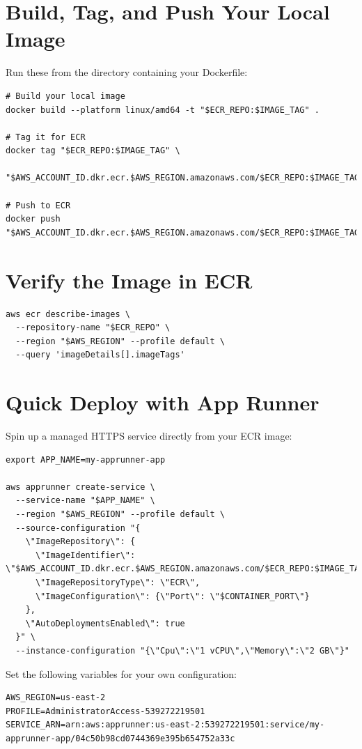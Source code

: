 \section{Build, Tag, and Push Your Local Image}
Run these from the directory containing your Dockerfile:

\begin{verbatim}
# Build your local image
docker build --platform linux/amd64 -t "$ECR_REPO:$IMAGE_TAG" .

# Tag it for ECR
docker tag "$ECR_REPO:$IMAGE_TAG" \
  "$AWS_ACCOUNT_ID.dkr.ecr.$AWS_REGION.amazonaws.com/$ECR_REPO:$IMAGE_TAG"

# Push to ECR
docker push "$AWS_ACCOUNT_ID.dkr.ecr.$AWS_REGION.amazonaws.com/$ECR_REPO:$IMAGE_TAG"
\end{verbatim}

\section{Verify the Image in ECR}
\begin{verbatim}
aws ecr describe-images \
  --repository-name "$ECR_REPO" \
  --region "$AWS_REGION" --profile default \
  --query 'imageDetails[].imageTags'
\end{verbatim}

\section{Quick Deploy with App Runner}
Spin up a managed HTTPS service directly from your ECR image:

\begin{verbatim}
export APP_NAME=my-apprunner-app

aws apprunner create-service \
  --service-name "$APP_NAME" \
  --region "$AWS_REGION" --profile default \
  --source-configuration "{
    \"ImageRepository\": {
      \"ImageIdentifier\": \"$AWS_ACCOUNT_ID.dkr.ecr.$AWS_REGION.amazonaws.com/$ECR_REPO:$IMAGE_TAG\",
      \"ImageRepositoryType\": \"ECR\",
      \"ImageConfiguration\": {\"Port\": \"$CONTAINER_PORT\"}
    },
    \"AutoDeploymentsEnabled\": true
  }" \
  --instance-configuration "{\"Cpu\":\"1 vCPU\",\"Memory\":\"2 GB\"}"
\end{verbatim}

Set the following variables for your own configuration:

\begin{verbatim}
AWS_REGION=us-east-2
PROFILE=AdministratorAccess-539272219501
SERVICE_ARN=arn:aws:apprunner:us-east-2:539272219501:service/my-apprunner-app/04c50b98cd0744369e395b654752a33c
\end{verbatim}


